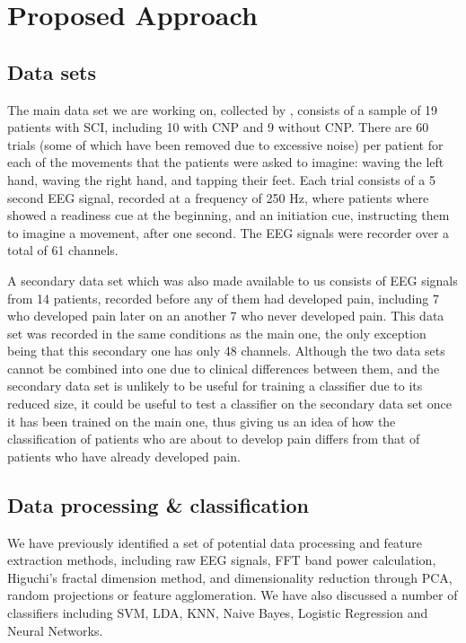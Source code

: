\documentclass{mprop}
\begin{document}
\section{Proposed Approach}

\subsection{Data sets}

The main data set we are working on, collected by \citet{vuckovic_dynamic_2014}, consists of a sample of 19 patients with SCI, including 10 with CNP and 9 without CNP. There are 60 trials (some of which have been removed due to excessive noise) per patient for each of the movements that the patients were asked to imagine: waving the left hand, waving the right hand, and tapping their feet. Each trial consists of a 5 second EEG signal, recorded at a frequency of 250 Hz, where patients where showed a readiness cue at the beginning, and an initiation cue, instructing them to imagine a movement, after one second. The EEG signals were recorder over a total of 61 channels.

A secondary data set which was also made available to us consists of EEG signals from 14 patients, recorded before any of them had developed pain, including 7 who developed pain later on an another 7 who never developed pain. This data set was recorded in the same conditions as the main one, the only exception being that this secondary one has only 48 channels. Although the two data sets cannot be combined into one due to clinical differences between them, and the secondary data set is unlikely to be useful for training a classifier due to its reduced size, it could be useful to test a classifier on the secondary data set once it has been trained on the main one, thus giving us an idea of how the classification of patients who are about to develop pain differs from that of patients who have already developed pain.

\subsection{Data processing \& classification}

We have previously identified a set of potential data processing and feature extraction methods, including raw EEG signals, FFT band power calculation, Higuchi's fractal dimension method, and dimensionality reduction through PCA, random projections or feature agglomeration. We have also discussed a number of classifiers including SVM, LDA, KNN, Naive Bayes, Logistic Regression and Neural Networks.
\end{document}
